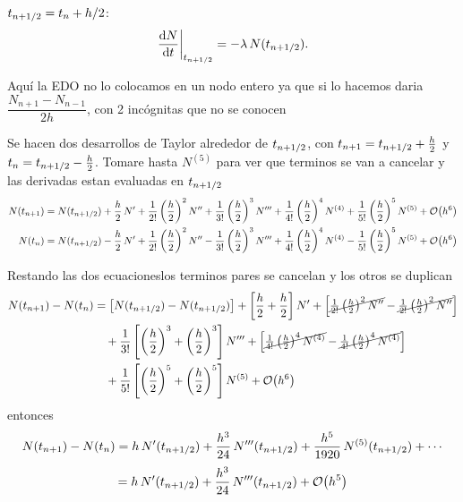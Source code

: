 $t_{n+1/2} = t_n + h/2$:
\[
\left.\frac{\mathrm{d} N}{\mathrm{d} t}\right|_{t_{n+1/2}} = -\lambda\,N(t_{n+1/2}).
\]

Aquí la EDO no lo colocamos en un nodo entero ya que si lo hacemos daria
$\dfrac{N_{n+1} - N_{n-1}}{2h}$, con 2 incógnitas que no se conocen



Se hacen dos desarrollos de Taylor alrededor de $t_{n+1/2}$, con
$t_{n+1} = t_{n+1/2} + \tfrac{h}{2}$ y $t_n = t_{n+1/2} - \tfrac{h}{2}$.
Tomare hasta $N^{(5)}$ para ver que terminos se van a cancelar y las derivadas estan evaluadas en $t_{n+1/2}$
\begin{align*}
	N(t_{n+1}) &= N(t_{n+1/2}) + \frac{h}{2}\,N'
	+ \frac{1}{2!}\left(\frac{h}{2}\right)^2 N''
	+ \frac{1}{3!}\left(\frac{h}{2}\right)^3 N'''
	+ \frac{1}{4!}\left(\frac{h}{2}\right)^4 N^{(4)}
	+ \frac{1}{5!}\left(\frac{h}{2}\right)^5 N^{(5)} + \mathcal{O}\!\left(h^6\right)\\
	N(t_n)     &= N(t_{n+1/2}) - \frac{h}{2}\,N'
	+ \frac{1}{2!}\left(\frac{h}{2}\right)^2 N''
	- \frac{1}{3!}\left(\frac{h}{2}\right)^3 N'''
	+ \frac{1}{4!}\left(\frac{h}{2}\right)^4 N^{(4)}
	- \frac{1}{5!}\left(\frac{h}{2}\right)^5 N^{(5)} + \mathcal{O}\!\left(h^6\right)
\end{align*}

Restando las dos ecuacioneslos terminos pares se cancelan y los otros se duplican
\begin{align*}
	N(t_{n+1}) - N(t_n)
	&= \bigl[N(t_{n+1/2}) - N(t_{n+1/2})\bigr]
	+ \left[\frac{h}{2} + \frac{h}{2}\right] N'
	+ \Bigl[\cancel{\tfrac{1}{2!}\left(\tfrac{h}{2}\right)^2 N''} - \cancel{\tfrac{1}{2!}\left(\tfrac{h}{2}\right)^2 N''}\Bigr]\\
	&\quad + \frac{1}{3!}\left[\left(\frac{h}{2}\right)^3 + \left(\frac{h}{2}\right)^3\right] N'''
	+ \Bigl[\cancel{\tfrac{1}{4!}\left(\tfrac{h}{2}\right)^4 N^{(4)}} - \cancel{\tfrac{1}{4!}\left(\tfrac{h}{2}\right)^4 N^{(4)}}\Bigr]\\
	&\quad + \frac{1}{5!}\left[\left(\frac{h}{2}\right)^5 + \left(\frac{h}{2}\right)^5\right] N^{(5)} + \mathcal{O}\!\left(h^6\right)
\end{align*}
entonces
\[
N(t_{n+1}) - N(t_n) = h\,N'(t_{n+1/2}) + \frac{h^3}{24}\,N'''(t_{n+1/2}) + \frac{h^5}{1920}\,N^{(5)}(t_{n+1/2}) + \cdots
\]
\[
= h\,N'(t_{n+1/2}) + \frac{h^3}{24}\,N'''(t_{n+1/2}) + \mathcal{O}\!\left(h^5\right)
\]

